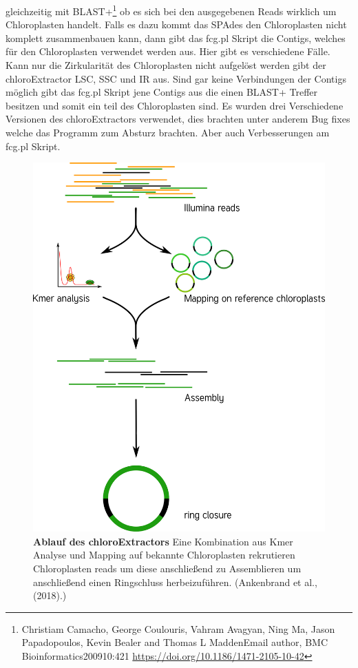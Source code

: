 \documentclass{scrartcl}
\begin{document}
gleichzeitig mit BLAST+\footnote{Christiam Camacho, George Coulouris, Vahram Avagyan, Ning Ma, Jason Papadopoulos, Kevin Bealer and Thomas L MaddenEmail author, BMC Bioinformatics200910:421 \url{https://doi.org/10.1186/1471-2105-10-42}} ob es sich bei den ausgegebenen Reads wirklich um Chloroplasten handelt. Falls es dazu kommt
das SPAdes den Chloroplasten nicht komplett zusammenbauen kann, dann gibt das fcg.pl Skript die Contigs, welches für den Chloroplasten verwendet werden aus. Hier gibt es verschiedene Fälle. Kann nur die Zirkularität 
des Chloroplasten nicht aufgelöst werden gibt der chloroExtractor LSC, SSC und IR aus. Sind gar keine Verbindungen der Contigs möglich gibt das fcg.pl Skript jene Contigs aus die einen BLAST+ Treffer besitzen und somit ein
teil des Chloroplasten sind.  Es wurden drei Verschiedene Versionen des chloroExtractors verwendet, dies brachten unter anderem Bug fixes welche das 
Programm zum Absturz brachten. Aber auch Verbesserungen am fcg.pl Skript.

\begin{figure}
\includegraphics[width=.9\linewidth]{./workflow.png}
\caption[Ablauf des chloroExtractors]{\textbf{Ablauf des chloroExtractors} Eine Kombination aus Kmer Analyse und Mapping auf bekannte Chloroplasten rekrutieren Chloroplasten reads um diese anschließend zu Assemblieren um anschließend einen Ringschluss herbeizuführen. (Ankenbrand et al., (2018).)}
\end{figure}
\end{document}

